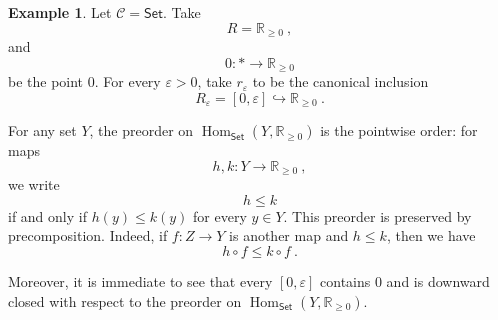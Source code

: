 \documentclass[a4paper,reqno,oneside]{amsart}
\theoremstyle{definition}
\newtheorem{example}[theorem]{Example}
\theoremstyle{remark}
\renewcommand{\epsilon}{\varepsilon}
\numberwithin{equation}{section}
\begin{document}
\begin{example}
Let $ \mathcal C=\mathsf{Set}$. Take
\begin{equation}
    R=\mathbb R_{\geq 0} \ ,
\end{equation}
and
\begin{equation}
    0\colon *\to \mathbb R_{\geq 0}
\end{equation}
be the point $0$. For every $\varepsilon>0$, take $r_\epsilon$ to be the canonical inclusion
\begin{equation}
    R_\varepsilon=[0,\varepsilon]
    \hookrightarrow
    \mathbb R_{\geq 0} \ .
\end{equation}

For any set $Y$, the preorder on $\operatorname{Hom}_{\mathsf{Set}}(Y,\mathbb R_{\geq 0})$ is the pointwise order: for maps
\begin{equation}
    h,k\colon Y\to \mathbb R_{\geq 0} \ ,
\end{equation}
we write
\begin{equation}
    h\leq k
\end{equation}
if and only if $h(y)\leq k(y)$ for every $y\in Y$. This preorder is preserved by precomposition. Indeed, if $f\colon Z\to Y$ is another map and $h\leq k$, then we have
\begin{equation}
    h\circ f\leq k\circ f \ .
\end{equation}

Moreover, it is immediate to see that every $[0,\varepsilon]$ contains $0$ and is downward closed with respect to the preorder on $\operatorname{Hom}_{\mathsf{Set}}(Y,\mathbb R_{\geq 0})$.
\end{example}
\end{document}
